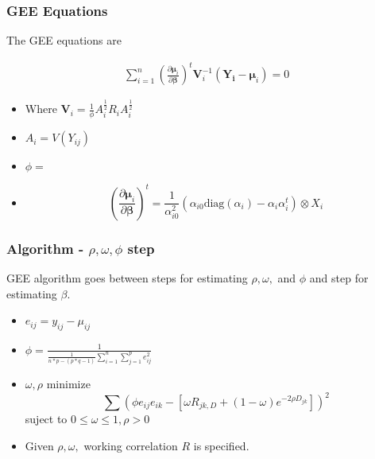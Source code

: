 \documentclass{beamer}
\begin{document}
\begin{frame}
\frametitle{GEE Equations}
The GEE equations are

\begin{align*}
  \sum_{i = 1}^n  \left(\frac{\partial  \boldsymbol\mu_i }{\partial \boldsymbol\beta }\right)^t\mathbf{V}_i^{-1}(\mathbf{Y_i} - \boldsymbol\mu_i) = 0
\end{align*}

\begin{itemize}
  \item Where $\boldsymbol V_i = \frac{1}{\phi} A_i^{\tfrac{1}{2}}R_iA_i^{\tfrac{1}{2}}$

  \item $A_i = V(Y_{ij})$

  \item $\phi = $

  \item \[ \left(\frac{\partial  \boldsymbol\mu_i }{\partial \boldsymbol\beta }\right)^t  = \frac{1}{\alpha_{i0}^2} (\alpha_{i0} \text{diag}(\alpha_i) - \alpha_i \alpha_i^t)  \otimes X_i\]


\end{itemize}



\end{frame}

\begin{frame}
\frametitle{Algorithm - $\rho, \omega, \phi$ step}

GEE algorithm goes between steps for estimating $\rho, \omega, $ and $\phi$ and step for estimating $\beta$.

\begin{itemize}
  \item $e_{ij} = y_{ij} - \mu_{ij}$
  \item $\phi = \frac{1}{\frac{1}{n*p - (p*q - 1)}\sum_{i = 1}^n \sum_{j = 1}^p e_{ij}^2}$
  \item $\omega, \rho$ minimize
  \[ \sum (\phi e_{ij}e_{ik} - [ \omega R_{jk,D} + (1 - \omega) e^{-2 \rho D_{jk}}])^2  \]
  suject to $0 \leq \omega \leq 1, \rho > 0$
  \item Given $\rho, \omega,$ working correlation $R$ is specified.
\end{itemize}

\end{frame}
\end{document}
